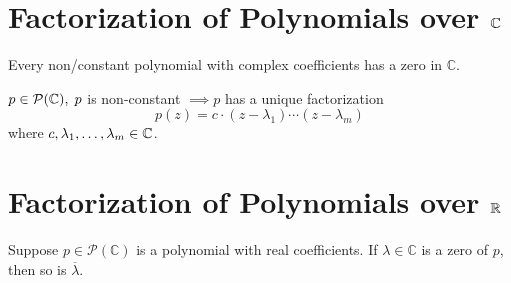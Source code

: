 \section{Factorization of Polynomials over $\mathbb{C}$}
\setcounter{thm}{11}
\begin{thm}
  \label{fundamental-theorem-of-algebra-first-version}
  Every non\-/constant polynomial with complex coefficients has a zero in $\mathbb{C}$.
\end{thm}

\begin{thm} 
  \label{fundamental-theorem-of-algebra-second-version}
  $p \in \mathcal{P}(\mathbb{C}), \; p$ is non-constant $\implies p$ has a unique factorization
  \begin{equation}
  	p(z)=c \cdot (z-\lambda_1) \cdots (z-\lambda_m) 
  \end{equation}
  where $c, \lambda_1, \dots, \lambda_m \in \mathbb{C}$.
\end{thm}

\section{Factorization of Polynomials over $\mathbb{R}$}
\begin{thm}
  Suppose $p\in \mathcal{P} (\mathbb{C})$ is a polynomial with real coefficients. If $\lambda \in \mathbb{C}$ is a zero of $p$, then so is $\overline{\lambda}$.
\end{thm}

